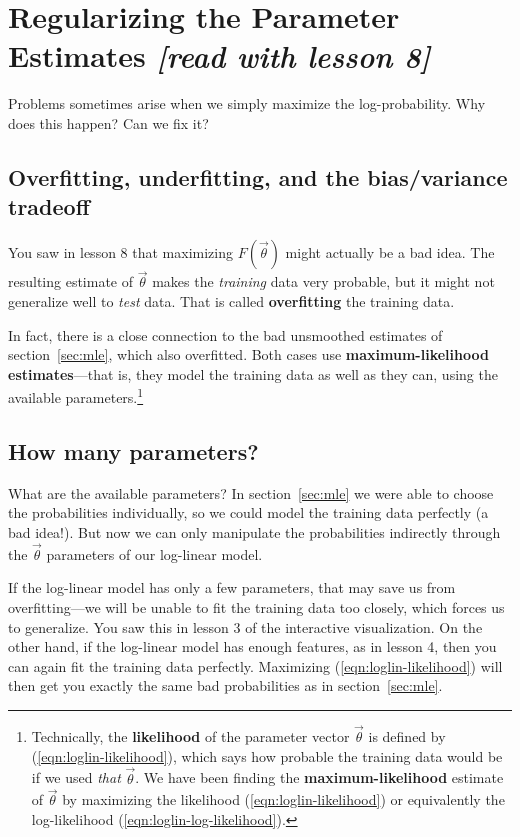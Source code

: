 \documentclass[11pt]{article}
\newcommand{\vtheta}{\vec{\theta}}
\begin{document}
\section{Regularizing the Parameter Estimates {\em [read with lesson 8]}}

Problems sometimes arise when we simply maximize the log-probability.
Why does this happen?  Can we fix it?

\subsection{Overfitting, underfitting, and the bias/variance tradeoff}

You saw in lesson 8 that maximizing $F(\vtheta)$ might actually be a
bad idea.  The resulting estimate of $\vtheta$ makes the {\em
  training} data very probable, but it might not generalize well to
{\em test} data.  That is called {\bf overfitting} the training data.

In fact, there is a close connection to the bad unsmoothed estimates
of section~\ref{sec:mle}, which also overfitted.  Both cases use {\bf
  maximum-likelihood estimates}---that is, they model the training
data as well as they can, using the available
parameters.\footnote{Technically, the {\bf likelihood} of the
  parameter vector $\vtheta$ is defined by
  (\ref{eqn:loglin-likelihood}), which says how probable the training
  data would be if we used {\em that} $\vtheta$.  We have been finding
  the {\bf maximum-likelihood} estimate of $\vtheta$ by maximizing the
  likelihood (\ref{eqn:loglin-likelihood}) or equivalently the
  log-likelihood (\ref{eqn:loglin-log-likelihood}).}

\subsection{How many parameters?}

What are the available parameters?  In section~\ref{sec:mle} we were
able to choose the probabilities individually, so we could model the
training data perfectly (a bad idea!).  But now we can only manipulate
the probabilities indirectly through the $\vtheta$ parameters of our
log-linear model.

If the log-linear model has only a few parameters, that may save us
from overfitting---we will be unable to fit the training data too
closely, which forces us to generalize.  You saw this in lesson 3 of
the interactive visualization.  On the other hand, if the log-linear
model has enough features, as in lesson 4, then you can again fit the
training data perfectly.  Maximizing (\ref{eqn:loglin-likelihood})
will then get you exactly the same bad probabilities as in
section~\ref{sec:mle}.
\end{document}
